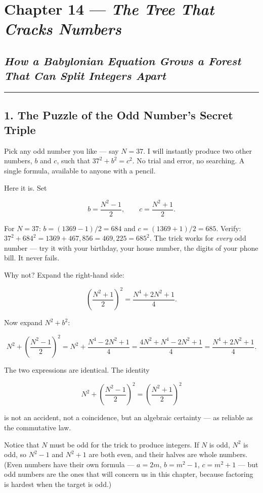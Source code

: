 \documentclass[12pt, letterpaper, openany]{book}
\theoremstyle{definition}
\theoremstyle{remark}
\begin{document}
\chapter{Chapter 14 --- \textit{The Tree That Cracks Numbers}}


\section*{\textit{How a Babylonian Equation Grows a Forest That Can Split Integers Apart}}



\bigskip\noindent\rule{\textwidth}{0.4pt}\bigskip



\section*{1. The Puzzle of the Odd Number's Secret Triple}


Pick any odd number you like --- say $N = 37$. I will instantly produce two other numbers, $b$ and $c$, such that $37^2 + b^2 = c^2$. No trial and error, no searching. A single formula, available to anyone with a pencil.

Here it is. Set

\[
b = \frac{N^2 - 1}{2}, \qquad c = \frac{N^2 + 1}{2}.
\]

For $N = 37$: $b = (1369 - 1)/2 = 684$ and $c = (1369 + 1)/2 = 685$. Verify: $37^2 + 684^2 = 1369 + 467{,}856 = 469{,}225 = 685^2$. The trick works for \textit{every} odd number --- try it with your birthday, your house number, the digits of your phone bill. It never fails.

Why not? Expand the right-hand side:

\[
\left(\frac{N^2 + 1}{2}\right)^{\!2} = \frac{N^4 + 2N^2 + 1}{4}.
\]

Now expand $N^2 + b^2$:

\[
N^2 + \left(\frac{N^2 - 1}{2}\right)^{\!2} = N^2 + \frac{N^4 - 2N^2 + 1}{4} = \frac{4N^2 + N^4 - 2N^2 + 1}{4} = \frac{N^4 + 2N^2 + 1}{4}.
\]

The two expressions are identical. The identity

\[
N^2 + \left(\frac{N^2 - 1}{2}\right)^{\!2} = \left(\frac{N^2 + 1}{2}\right)^{\!2}
\]

is not an accident, not a coincidence, but an algebraic certainty --- as reliable as the commutative law.

Notice that $N$ must be odd for the trick to produce integers. If $N$ is odd, $N^2$ is odd, so $N^2 - 1$ and $N^2 + 1$ are both even, and their halves are whole numbers. (Even numbers have their own formula --- $a = 2m$, $b = m^2 - 1$, $c = m^2 + 1$ --- but odd numbers are the ones that will concern us in this chapter, because factoring is hardest when the target is odd.)
\end{document}
